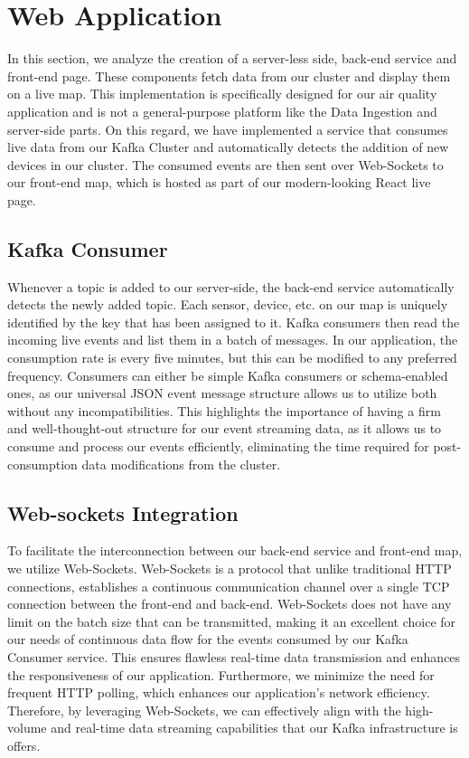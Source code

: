 \section{Web Application}
In this section, we analyze the creation of a server-less side, back-end service and front-end page. These components fetch data from our cluster and display them on a live map. This implementation is specifically designed for our air quality application and is not a general-purpose platform like the Data Ingestion and server-side parts. On this regard, we have implemented a service that consumes live data from our Kafka Cluster and automatically detects the addition of new devices in our cluster. The consumed events are then sent over Web-Sockets to our front-end map, which is hosted as part of our modern-looking React live page.


\subsection{Kafka Consumer}
Whenever a topic is added to our server-side, the back-end service automatically detects the newly added topic. Each sensor, device, etc. on our map is uniquely identified by the key that has been assigned to it. Kafka consumers then read the incoming live events and list them in a batch of messages. In our application, the consumption rate is every five minutes, but this can be modified to any preferred frequency. Consumers can either be simple Kafka consumers or schema-enabled ones, as our universal JSON event message structure allows us to utilize both without any incompatibilities. This highlights the importance of having a firm and well-thought-out structure for our event streaming data, as it allows us to consume and process our events efficiently, eliminating the time required for post-consumption data modifications from the cluster.


\subsection{Web-sockets Integration}
To facilitate the interconnection between our back-end service and front-end map, we utilize Web-Sockets. Web-Sockets is a protocol that unlike traditional HTTP connections, establishes a continuous communication channel over a single TCP connection between the front-end and back-end. Web-Sockets does not have any limit on the batch size that can be transmitted, making it an excellent choice for our needs of continuous data flow for the events consumed by our Kafka Consumer service. This ensures flawless real-time data transmission and enhances the responsiveness of our application. Furthermore, we minimize the need for frequent HTTP polling, which enhances our application's network efficiency. Therefore, by leveraging Web-Sockets, we can effectively align with the high-volume and real-time data streaming capabilities that our Kafka infrastructure is offers.

